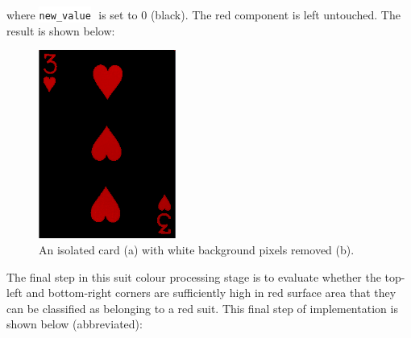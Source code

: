 \documentclass[a4paper,12pt,notitlepage]{article}
\newcommand{\code}[1]{\colorbox{white}{\lstinline[basicstyle=\ttfamily\color{black}]|#1|} }
\begin{document}
		where \code{new_value} is set to 0 (black). The red component is left untouched. The result is shown below:

		\begin{figure}[H]
			\centering
			\includegraphics[width=0.4\textwidth]{chris/image19}
			\caption{An isolated card (a) with white background pixels removed (b).}
			\label{fig:redchan}
		\end{figure}

		The final step in this suit colour processing stage is to evaluate whether the top-left and bottom-right corners are sufficiently high in red surface area that they can be classified as belonging to a red suit. This final step of implementation is shown below (abbreviated):
\end{document}
